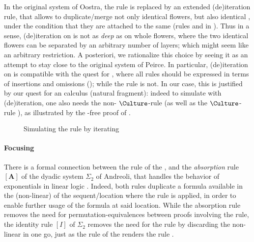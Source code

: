 \begin{scope}
In the original  system of Oostra, the  rule is replaced by an
extended (de)iteration rule, that allows to duplicate/merge not only identical
flowers, but also identical \emph{}, under the condition that they are
attached to the same  (rules 
and  in ). Thus in a sense, (de)iteration
on  is not as \emph{deep} as on whole flowers, where the two identical
flowers can be separated by an arbitrary number of layers; which might seem like
an arbitrary restriction. A posteriori, we rationalize this choice by seeing it
as an attempt to stay close to the original system  of Peirce. In
particular, (de)iteration on  is compatible with the quest for
\emph{}, where all rules should be expressed in terms of
insertions and omissions (); while the  rule is not.
In our case, this is justified by our quest for an \emph{} calculus
(natural fragment): indeed to simulate  with  (de)iteration, one
also needs the non- $\Culture$-rule  (as well as the
$\Culture$-rule ), as illustrated by the -free proof of
.

\begin{figure}
  
  \caption{Simulating the  rule by iterating }
\end{figure}

\paragraph{Focusing}

There is a formal connection between the  rule of the , and the \emph{absorption} rule $[\mathbf{A}]$ of the dyadic system
$\Sigma_2$ of Andreoli, that handles the  behavior of exponentials in
linear logic . Indeed, both rules duplicate a formula
available in the (non-linear)  of the sequent/location where the rule is
applied, in order to enable further usage of the formula at said location. While
the absorption rule removes the need for permutation-equivalences between proofs
involving the \emph{} rule, the identity rule $[I]$ of $\Sigma_2$
removes the need for the \emph{} rule by discarding the non-linear
 in one go, just as the  rule of the  renders
the  rule .


\end{scope}
